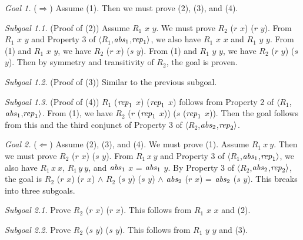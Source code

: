 \documentclass[envcountsame,runningheads]{llncs}
\begin{document}
{\it Goal 1.}
($\Rightarrow$)
Assume (1).  Then we must prove (2), (3), and (4).

{\it Subgoal 1.1.} (Proof of (2))
Assume $R_1$ $x$ $y$.  We must prove $R_2$ ($r$ $x$) ($r$ $y$).
From $R_1$ $x$ $y$ and Property 3 of
$\langle R_1$,${\it abs}_1$,${\it rep}_1 \rangle$,
we also have 
$R_1$ $x$ $x$ and
$R_1$ $y$ $y$.
From (1) and $R_1$ $x$ $y$, we have $R_2$ ($r$ $x$) ($s$ $y$).
From (1) and $R_1$ $y$ $y$, we have $R_2$ ($r$ $y$) ($s$ $y$).
Then by symmetry and transitivity of $R_2$, the goal is proven.

{\it Subgoal 1.2.} (Proof of (3)) Similar to the previous subgoal.

{\it Subgoal 1.3.} (Proof of (4))
$R_1$ (${\it rep}_1$ $x$) (${\it rep}_1$ $x$) follows from
Property 2 of 
$\langle R_1$,${\it abs}_1$,${\it rep}_1 \rangle$.
From (1),
we have
$R_2$ ($r$ (${\it rep}_1$ $x$)) ($s$ (${\it rep}_1$ $x$)).
Then the goal follows from this and the third conjunct of Property 3 of 
$\langle R_2$,${\it abs}_2$,${\it rep}_2 \rangle$.

{\it Goal 2.} ($\Leftarrow$)
Assume (2), (3), and (4).  We must prove (1).
Assume $R_1\ x\ y$.  Then we must prove $R_2$ ($r$ $x$) ($s$ $y$).
From $R_1\,x\ y$ and Property 3 of 
$\langle R_1$,${\it abs}_1$,${\it rep}_1 \rangle$,
we also have 
$R_1\,x\ x$,
$R_1\,y\ y$, and
${\it abs}_1$ $x$ = ${\it abs}_1$ $y$.
By Property 3 of 
$\langle R_2$,${\it abs}_2$,${\it rep}_2 \rangle$,
the goal is
$R_2$ ($r$ $x$) ($r$ $x$) $\wedge$
$R_2$ ($s$ $y$) ($s$ $y$) $\wedge$
${\it abs}_2$ ($r$ $x$) = ${\it abs}_2$ ($s$ $y$).
This breaks into three subgoals.

{\it Subgoal 2.1.} Prove $R_2$ ($r$ $x$) ($r$ $x$).
This follows from
$R_1$ $x$ $x$ and (2).

{\it Subgoal 2.2.} Prove $R_2$ ($s$ $y$) ($s$ $y$).
This follows from
$R_1$ $y$ $y$ and (3).
\end{document}
